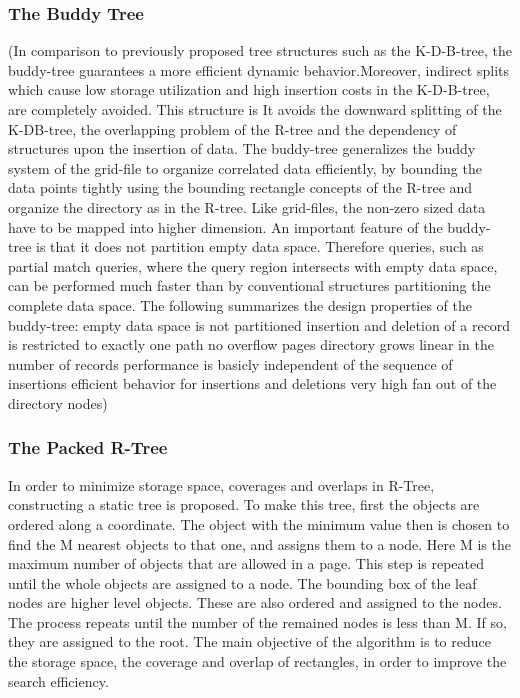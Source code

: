 \documentclass[a4paper,12pt]{article}
\begin{document}
\subsubsection{The Buddy Tree}
(In comparison to previously proposed tree structures such as the K-D-B-tree, the buddy-tree guarantees a more efficient dynamic behavior.Moreover, indirect splits which cause low storage utilization and high insertion costs in the K-D-B-tree, are completely avoided. This structure is 
It avoids the downward splitting of the K-DB-tree, the overlapping problem of the R-tree and the dependency of structures upon the insertion of data. The buddy-tree generalizes the buddy system of the grid-file to organize correlated data efficiently, by bounding the data points tightly using the bounding rectangle concepts of the R-tree and organize the directory as in the R-tree. Like grid-files, the non-zero sized data have to be mapped into higher dimension.
An important feature of the buddy-tree is that it does not partition empty data space. Therefore queries, such as partial match queries, where the query region intersects with empty data space, can be performed much faster than by conventional structures partitioning the complete data space.
The following summarizes the design properties of the buddy-tree:
empty data space is not partitioned
insertion and deletion of a record is restricted to
exactly one path
no overflow pages
directory grows linear in the number of records
performance is basicly independent of the sequence of
insertions
efficient behavior for insertions and deletions
very high fan out of the directory nodes)

\subsubsection{The Packed R-Tree}

In order to minimize storage space, coverages and overlaps in R-Tree, constructing a static tree is proposed. To make this tree, first the objects are ordered along a coordinate. The object with the minimum value then is chosen to find the M nearest objects to that one, and assigns them to a node. Here M is the maximum number of objects that are allowed in a page. This step is repeated until the whole objects are assigned to a node. The bounding box of the leaf nodes are higher level objects. These are also ordered and assigned to the nodes. The process repeats until the number of the remained nodes is less than M. If so, they are assigned to the root.
The main objective of the algorithm is to reduce the storage space, the coverage and overlap of rectangles, in order to improve the search efficiency.
\end{document}

